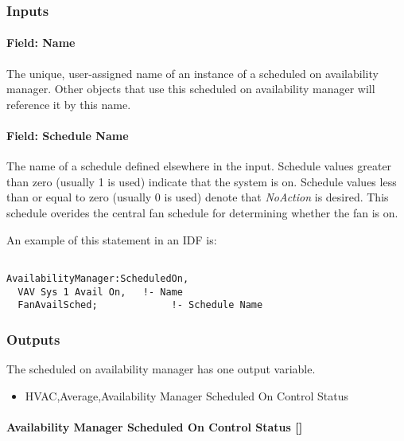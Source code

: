 \subsubsection{Inputs}\label{inputs-1-044}

\paragraph{Field: Name}\label{field-name-1-043}

The unique, user-assigned name of an instance of a scheduled on availability manager. Other objects that use this scheduled on availability manager will reference it by this name.

\paragraph{Field: Schedule Name}\label{field-schedule-name-1-003}

The name of a schedule defined elsewhere in the input. Schedule values greater than zero (usually 1 is used) indicate that the system is on. Schedule values less than or equal to zero (usually 0 is used) denote that \emph{NoAction} is desired. This schedule overides the central fan schedule for determining whether the fan is on.

An example of this statement in an IDF is:

\begin{lstlisting}

AvailabilityManager:ScheduledOn,
  VAV Sys 1 Avail On,   !- Name
  FanAvailSched;             !- Schedule Name
\end{lstlisting}

\subsubsection{Outputs}\label{outputs-036}

The scheduled on availability manager has one output variable.

\begin{itemize}
\tightlist
\item
  HVAC,Average,Availability Manager Scheduled On Control Status
\end{itemize}

\paragraph{Availability Manager Scheduled On Control Status {[]}}\label{availability-manager-scheduled-on-control-status}

